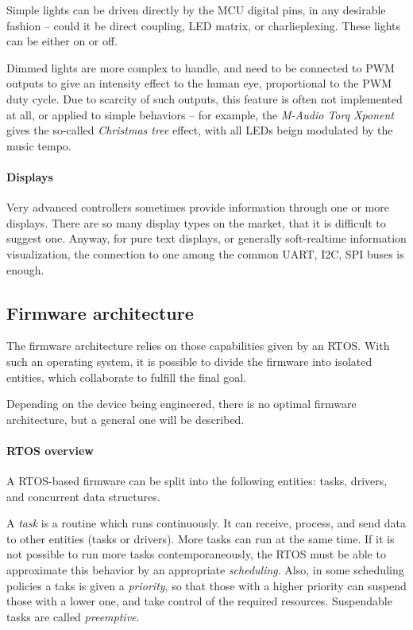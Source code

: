 \documentclass[a4paper,10pt]{article}
\begin{document}
\begin{multicols}{2}
Simple lights can be driven directly by the MCU digital pins, in
any desirable fashion -- could it be direct coupling, LED matrix,
or charlieplexing. These lights can be either on or off.

Dimmed lights are more complex to handle, and need to be connected to PWM
outputs to give an intensity effect to the human eye, proportional to the
PWM duty cycle. Due to scarcity of such outputs, this feature is often not
implemented at all, or applied to simple behaviors -- for example, the
\emph{M-Audio Torq Xponent} \cite{maudio_xponent} gives the so-called
\emph{Christmas tree} effect, with all LEDs beign modulated by the music tempo.


\paragraph{Displays}
Very advanced controllers sometimes provide information through one or more
displays. There are so many display types on the market, that it is difficult
to suggest one. Anyway, for pure text displays, or generally soft-realtime
information visualization, the connection to one among the common UART, I2C,
SPI buses is enough.


\subsection{Firmware architecture}

The firmware architecture relies on those capabilities given by an RTOS. With
such an operating system, it is possible to divide the firmware into isolated
entities, which collaborate to fulfill the final goal.

Depending on the device being engineered, there is no optimal firmware
architecture, but a general one will be described.


\paragraph{RTOS overview}
A RTOS-based firmware can be split into the following entities: tasks,
drivers, and concurrent data structures.

A \emph{task} is a routine which runs continuously. It can receive, process,
and send data to other entities (tasks or drivers). More tasks can run at the
same time. If it is not possible to run more tasks contemporaneously, the RTOS
must be able to approximate this behavior by an appropriate \emph{scheduling}.
Also, in some scheduling policies a taks is given a \emph{priority}, so that
those with a higher priority can suspend those with a lower one, and take
control of the required resources. Suspendable tasks are called
\emph{preemptive}.


\end{multicols}
\end{document}
